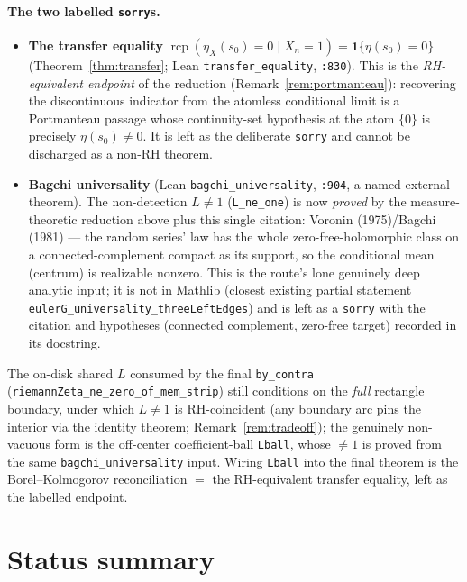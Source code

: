 \documentclass[11pt,a4paper]{article}
\theoremstyle{definition}
\newcommand{\etaX}{\eta_X}
\newcommand{\rcp}{\operatorname{rcp}}
\begin{document}
\paragraph{The two labelled \texttt{sorry}s.}
\begin{itemize}
  \item \textbf{The transfer equality} \(\rcp(\etaX(s_0)=0\mid X_n=1)=\mathbf{1}\{\eta(s_0)=0\}\)
        (Theorem~\ref{thm:transfer}; Lean \texttt{transfer\_equality}, \texttt{:830}). This is the
        \emph{RH-equivalent endpoint} of the reduction (Remark~\ref{rem:portmanteau}): recovering
        the discontinuous indicator from the atomless conditional limit is a Portmanteau passage
        whose continuity-set hypothesis at the atom \(\{0\}\) is precisely \(\eta(s_0)\neq0\). It is
        left as the deliberate \texttt{sorry} and cannot be discharged as a non-RH theorem.
  \item \textbf{Bagchi universality} (Lean \texttt{bagchi\_universality}, \texttt{:904}, a named
        external theorem). The non-detection \(L\neq1\) (\texttt{L\_ne\_one}) is now \emph{proved}
        by the measure-theoretic reduction above plus this single citation: Voronin (1975)/Bagchi
        (1981) --- the random series' law has the whole zero-free-holomorphic class on a
        connected-complement compact as its support, so the conditional mean (centrum) is
        realizable nonzero. This is the route's lone genuinely deep analytic input; it is not in
        Mathlib (closest existing partial statement \texttt{eulerG\_universality\_threeLeftEdges})
        and is left as a \texttt{sorry} with the citation and hypotheses (connected complement,
        zero-free target) recorded in its docstring.
\end{itemize}
The on-disk shared \(L\) consumed by the final \texttt{by\_contra}
(\texttt{riemannZeta\_ne\_zero\_of\_mem\_strip}) still conditions on the \emph{full} rectangle
boundary, under which \(L\neq1\) is RH-coincident (any boundary arc pins the interior via the
identity theorem; Remark~\ref{rem:tradeoff}); the genuinely non-vacuous form is the off-center
coefficient-ball \texttt{Lball}, whose \(\neq1\) is proved from the same
\texttt{bagchi\_universality} input. Wiring \texttt{Lball} into the final theorem is the
Borel--Kolmogorov reconciliation \(=\) the RH-equivalent transfer equality, left as the labelled
endpoint.

\section*{Status summary}
\end{document}

